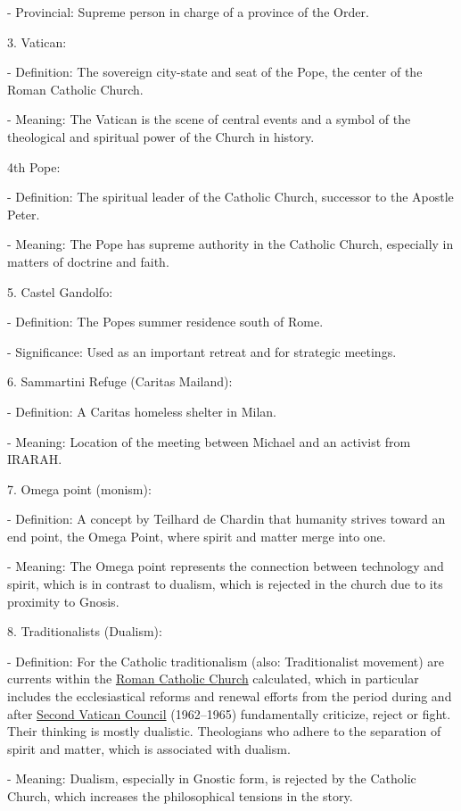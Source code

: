 \documentclass[
]{article}
\begin{document}
- Provincial: Supreme person in charge of a province of the Order.

3. Vatican:

- Definition: The sovereign city-state and seat of the Pope, the center
of the Roman Catholic Church.

- Meaning: The Vatican is the scene of central events and a symbol of
the theological and spiritual power of the Church in history.

4th Pope:

- Definition: The spiritual leader of the Catholic Church, successor to
the Apostle Peter.

- Meaning: The Pope has supreme authority in the Catholic Church,
especially in matters of doctrine and faith.

5. Castel Gandolfo:

- Definition: The Pope\textquotesingle s summer residence south of Rome.

- Significance: Used as an important retreat and for strategic meetings.

6. Sammartini Refuge (Caritas Mailand):

- Definition: A Caritas homeless shelter in Milan.

- Meaning: Location of the meeting between Michael and an activist from
IRARAH.

7. Omega point (monism):

- Definition: A concept by Teilhard de Chardin that humanity strives
toward an end point, the Omega Point, where spirit and matter merge into
one.

- Meaning: The Omega point represents the connection between technology
and spirit, which is in contrast to dualism, which is rejected in the
church due to its proximity to Gnosis.

8. Traditionalists (Dualism):

- Definition: For the Catholic traditionalism (also: Traditionalist
movement) are currents within the
\href{https://de.wikipedia.org/wiki/R\%C3\%B6misch-katholische_Kirche}{Roman
Catholic Church} calculated, which in particular includes the
ecclesiastical reforms and renewal efforts from the period during and
after
\href{https://de.wikipedia.org/wiki/Zweites_Vatikanisches_Konzil}{Second
Vatican Council} (1962--1965) fundamentally criticize, reject or fight.
Their thinking is mostly dualistic. Theologians who adhere to the
separation of spirit and matter, which is associated with dualism.

- Meaning: Dualism, especially in Gnostic form, is rejected by the
Catholic Church, which increases the philosophical tensions in the
story.
\end{document}
